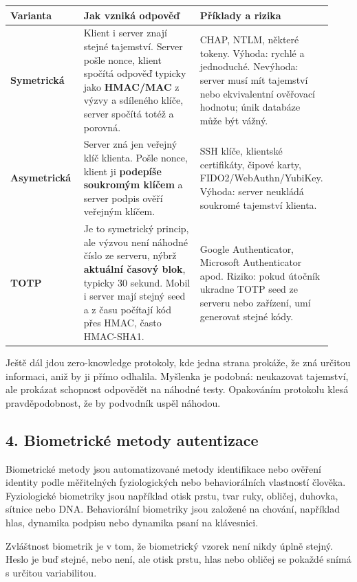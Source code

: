 \begin{longtable}{p{0.23\linewidth}p{0.39\linewidth}p{0.31\linewidth}}
\toprule
\textbf{Varianta} & \textbf{Jak vzniká odpověď} & \textbf{Příklady a rizika} \\
\midrule\endhead
\textbf{Symetrická} & Klient i server znají stejné tajemství. Server pošle nonce, klient spočítá odpověď typicky jako \textbf{HMAC/MAC} z výzvy a sdíleného klíče, server spočítá totéž a porovná. & CHAP, NTLM, některé tokeny. Výhoda: rychlé a jednoduché. Nevýhoda: server musí mít tajemství nebo ekvivalentní ověřovací hodnotu; únik databáze může být vážný. \\
\addlinespace
\textbf{Asymetrická} & Server zná jen veřejný klíč klienta. Pošle nonce, klient ji \textbf{podepíše soukromým klíčem} a server podpis ověří veřejným klíčem. & SSH klíče, klientské certifikáty, čipové karty, FIDO2/WebAuthn/YubiKey. Výhoda: server neukládá soukromé tajemství klienta. \\
\addlinespace
\textbf{TOTP} & Je to symetrický princip, ale výzvou není náhodné číslo ze serveru, nýbrž \textbf{aktuální časový blok}, typicky 30 sekund. Mobil i server mají stejný seed a z času počítají kód přes HMAC, často HMAC-SHA1. & Google Authenticator, Microsoft Authenticator apod. Riziko: pokud útočník ukradne TOTP seed ze serveru nebo zařízení, umí generovat stejné kódy. \\
\bottomrule
\end{longtable}

Ještě dál jdou zero-knowledge protokoly, kde jedna strana prokáže, že zná určitou informaci, aniž by ji přímo odhalila. Myšlenka je podobná: neukazovat tajemství, ale prokázat schopnost odpovědět na náhodné testy. Opakováním protokolu klesá pravděpodobnost, že by podvodník uspěl náhodou.

\subsection*{4. Biometrické metody autentizace}

Biometrické metody jsou automatizované metody identifikace nebo ověření identity podle měřitelných fyziologických nebo behaviorálních vlastností člověka. Fyziologické biometriky jsou například otisk prstu, tvar ruky, obličej, duhovka, sítnice nebo DNA. Behaviorální biometriky jsou založené na chování, například hlas, dynamika podpisu nebo dynamika psaní na klávesnici.

Zvláštnost biometrik je v tom, že biometrický vzorek není nikdy úplně stejný. Heslo je buď stejné, nebo není, ale otisk prstu, hlas nebo obličej se pokaždé snímá s určitou variabilitou.

